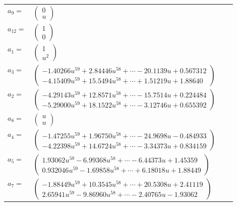 \documentclass[1p]{elsarticle_modified}
\theoremstyle{definition}
\begin{document}
\begin{tabular}{m{7pt} m{180pt} m{7pt} m{180pt} }
\flushright $a_{9}=$&$\begin{pmatrix}0\\u\end{pmatrix}$ \\
\flushright $a_{12}=$&$\begin{pmatrix}1\\0\end{pmatrix}$ \\
\flushright $a_{1}=$&$\begin{pmatrix}1\\u^2\end{pmatrix}$ \\
\flushright $a_{3}=$&$\begin{pmatrix}-1.40266 u^{59}+2.84446 u^{58}+\cdots-20.1139 u+0.567312\\-4.15409 u^{59}+15.5494 u^{58}+\cdots+1.51219 u+1.88640\end{pmatrix}$ \\
\flushright $a_{2}=$&$\begin{pmatrix}-4.29143 u^{59}+12.8571 u^{58}+\cdots-15.7514 u+0.224484\\-5.29000 u^{59}+18.1522 u^{58}+\cdots-3.12746 u+0.655392\end{pmatrix}$ \\
\flushright $a_{8}=$&$\begin{pmatrix}u\\u\end{pmatrix}$ \\
\flushright $a_{4}=$&$\begin{pmatrix}-1.47255 u^{59}+1.96750 u^{58}+\cdots-24.9698 u-0.484933\\-4.22398 u^{59}+14.6724 u^{58}+\cdots-3.34373 u+0.834159\end{pmatrix}$ \\
\flushright $a_{5}=$&$\begin{pmatrix}1.93062 u^{59}-6.99368 u^{58}+\cdots-6.44373 u+1.45359\\0.932046 u^{59}-1.69858 u^{58}+\cdots+6.18018 u+1.88449\end{pmatrix}$ \\
\flushright $a_{7}=$&$\begin{pmatrix}-1.88449 u^{59}+10.3545 u^{58}+\cdots+20.5308 u+2.41119\\2.65941 u^{59}-9.86960 u^{58}+\cdots-2.40765 u-1.93062\end{pmatrix}$ \\

\end{tabular}
\end{document}
